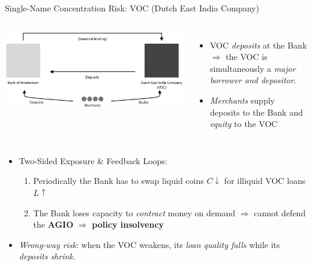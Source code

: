 \documentclass[aspectratio=169, xcolor=table]{beamer}
\begin{document}
\begin{frame}{Single-Name Concentration Risk: VOC (Dutch East India Company)}
  \begin{columns}[T,onlytextwidth]
    \begin{center}
      \includegraphics[width=\linewidth]{pasted-images/bank_diagram.png}
    \end{center}
    \vspace{1mm}

    \footnotesize
    \vspace{1cm}
    \begin{itemize}
      \item VOC \emph{deposits} at the Bank $\Rightarrow$ the VOC is simultaneously a \emph{major borrower and depositor}.
      \item \emph{Merchants} supply deposits to the Bank and \emph{equity} to the VOC
    \end{itemize}
  \end{columns}
  \footnotesize
  \begin{itemize}
    \item Two-Sided Exposure \& Feedback Loops:
          \begin{enumerate}
            \item Periodically the Bank has to swap liquid coins $C \downarrow$ for illiquid VOC loans $L \uparrow$
            \item The Bank loses capacity to \emph{contract} money on demand $\Rightarrow$ cannot defend the \textbf{AGIO} $\Rightarrow$ \textbf{policy insolvency}
          \end{enumerate}
    \item \emph{Wrong-way risk}: when the VOC weakens, its \emph{loan quality falls} while its \emph{deposits shrink}.
  \end{itemize}
\end{frame}
\end{document}

